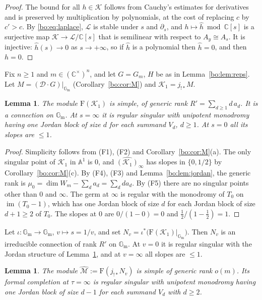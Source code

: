 \documentclass[11pt,a4paper]{article}
\newtheorem{lemma}[theorem]{Lemma}
\theoremstyle{definition}
\theoremstyle{remark}
\numberwithin{equation}{section}
\newcommand{\C}{\mathbb{C}}
\newcommand{\Gm}{\mathbb{G}_{\mathrm{m}}}
\newcommand{\A}{\mathbb{A}}
\newcommand{\cD}{\mathcal{D}}
\newcommand{\cL}{\mathcal{L}}
\newcommand{\cM}{\mathcal{M}}
\newcommand{\Four}{\mathrm{F}}
\DeclareMathOperator{\im}{im}
\begin{document}
\begin{proof}
The bound for all $h\in\mathcal K$ follows from Cauchy's estimates for derivatives and is preserved by multiplication by polynomials, at the cost of replacing $c$ by $c'>c$. By \eqref{bo:eq:laplace}, $\cL$ is stable under $s$ and $\partial_s$, and $h\mapsto\widehat h\bmod\C[s]$ is a surjective map $\mathcal K\to\cL/\C[s]$ that is semilinear with respect to $A_y\cong A_s$. It is injective: $\widehat h(s)\to0$ as $s\to+\infty$, so if $\widehat h$ is a polynomial then $\widehat h=0$, and then $h=0$.
\end{proof}

Fix $n\ge1$ and $m\in(\C^\times)^n$, and let $G=G_m$, $H$ be as in Lemma~\ref{bo:lem:reps}. Let $M=(\cD\cdot G)|_{\Gm}$ (Corollary~\ref{bo:cor:M}) and $\mathcal K_1=j_{!*}M$.

\begin{lemma}\label{bo:lem:K1}
The module $\Four(\mathcal K_1)$ is simple, of generic rank $R'=\sum_{d\ge1}d\,a_d$. It is a connection on $\Gm$. At $s=\infty$ it is regular singular with unipotent monodromy having one Jordan block of size $d$ for each summand $V_d$, $d\ge1$. At $s=0$ all its slopes are $\le1$.
\end{lemma}

\begin{proof}
Simplicity follows from (F1), (F2) and Corollary~\ref{bo:cor:M}(a). The only singular point of $\mathcal K_1$ in $\A^1$ is $0$, and $\widehat{(\mathcal K_1)}_\infty$ has slopes in $\{0,1/2\}$ by Corollary~\ref{bo:cor:M}(c). By (F4), (F3) and Lemma~\ref{bo:lem:jordan}, the generic rank is $\mu_0=\dim W_m-\sum_da_d=\sum_dda_d$. By (F5) there are no singular points other than $0$ and $\infty$. The germ at $\infty$ is regular with the monodromy of $T_0$ on $\im(T_0-1)$, which has one Jordan block of size $d$ for each Jordan block of size $d+1\ge2$ of $T_0$. The slopes at $0$ are $0/(1-0)=0$ and $\tfrac12/(1-\tfrac12)=1$.
\end{proof}

Let $\iota:\Gm\to\Gm$, $v\mapsto s=1/v$, and set $N_v=\iota^*\bigl(\Four(\mathcal K_1)|_{\Gm}\bigr)$. Then $N_v$ is an irreducible connection of rank $R'$ on $\Gm$. At $v=0$ it is regular singular with the Jordan structure of Lemma~\ref{bo:lem:K1}, and at $v=\infty$ all slopes are $\le1$.

\begin{lemma}\label{bo:lem:Mhat}
The module $\widehat{\cM}:=\Four(j_{!*}N_v)$ is simple of generic rank $o(m)$. Its formal completion at $\tau=\infty$ is regular singular with unipotent monodromy having one Jordan block of size $d-1$ for each summand $V_d$ with $d\ge2$.
\end{lemma}
\end{document}
